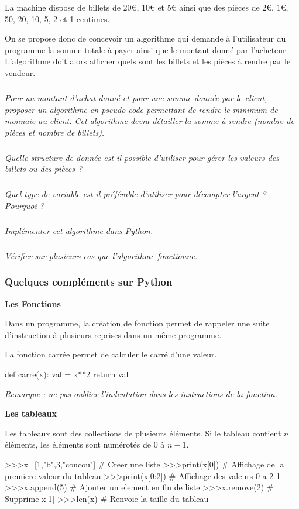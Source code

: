 \documentclass[10pt]{article}
\begin{document}
\setcounter{subparagraph}{0}

La machine dispose de billets de 20€, 10€ et 5€ ainsi que des pièces de 2€, 1€, 50, 20, 10, 5, 2 et 1 centimes. 

On se propose donc de concevoir un algorithme qui demande à l'utilisateur du programme la somme totale à payer ainsi que le montant donné par l'acheteur. L'algorithme doit alors afficher quels sont les billets et les pièces à rendre par le vendeur. 


\subparagraph{}
\textit{Pour un montant d'achat donné et pour une somme donnée par le client, proposer un algorithme en pseudo code permettant de rendre le minimum de monnaie au client. Cet algorithme devra détailler la somme à rendre (nombre de pièces et nombre de billets).}

\subparagraph{}
\textit{Quelle structure de donnée est-il possible d'utiliser pour gérer les valeurs des billets ou des pièces ?}

\subparagraph{}
\textit{Quel type de variable est il préférable d'utiliser pour décompter l'argent ? Pourquoi ?}

\subparagraph{}
\textit{Implémenter cet algorithme dans Python.}

\subparagraph{}
\textit{Vérifier sur plusieurs cas que l'algorithme fonctionne.}


\subsubsection*{Quelques compléments sur Python}


\begin{py}
\textbf{Les Fonctions}

Dans un programme, la création de fonction permet de rappeler une suite d'instruction à plusieurs reprises dans un même programme.

La fonction carrée permet de calculer le carré d'une valeur. 

\begin{python}
def  carre(x):
    val = x**2
    return val
\end{python}

\textit{Remarque : ne pas oublier l'indentation dans les instructions de la fonction.}
\end{py}


\begin{py}
\textbf{Les tableaux}

Les tableaux sont des collections de plusieurs éléments. Si le tableau contient $n$ éléments, les éléments sont numérotés de 0 à $n-1$.

\begin{python}
>>>x=[1,"b",3,"coucou"] # Creer une liste
>>>print(x[0]) # Affichage de la premiere valeur du tableau
>>>print(x[0:2]) # Affichage des valeurs 0 a 2-1
>>>x.append(5) # Ajouter un element en fin de liste
>>>x.remove(2) # Supprime x[1]
>>>len(x) # Renvoie la taille du tableau
\end{python}
\end{py}
\end{document}
